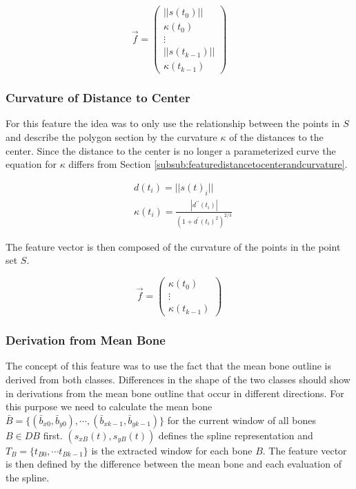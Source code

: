 \documentclass[pdftex,12pt,a4paper]{report}
\begin{document}
\begin{equation}
\vec{f} = \left( \begin{array}{c}
||s(t_0)|| \\
\kappa(t_0) \\
\vdots \\
||s(t_{k-1})|| \\
\kappa(t_{k-1})
\end{array} \right)
\end{equation}

\subsubsection{Curvature of Distance to Center}

For this feature the idea was to only use the relationship between the points in $S$ and describe
the polygon section by the curvature $\kappa$ of the distances to the center. Since the distance 
to the center is no longer a parameterized curve the equation for $\kappa$ differs from
Section \ref{subsub:featuredistancetocenterandcurvature}.

\begin{equation}
\begin{split}
& d(t_i) = ||s(t)_i|| \\
& \kappa(t_i) = \frac{|d^{\prime\prime}(t_i)|}{(1 + d^\prime(t_i)^2)^{2/3}}
\end{split}
\end{equation}

The feature vector is then composed of the curvature of the points in the point set $S$.

\begin{equation}
\vec{f} = \left( \begin{array}{c}
\kappa(t_0) \\
\vdots \\
\kappa(t_{k-1})
\end{array} \right)
\end{equation}

\subsubsection{Derivation from Mean Bone}

The concept of this feature was to use the fact that the mean bone outline is derived from both classes.
Differences in the shape of the two classes should show in derivations from the mean bone outline that
occur in different directions. For this purpose we need to calculate the mean bone $\bar{B} = \{ (\bar{b}_{x0}, \bar{b}_{y0}), \cdots, (\bar{b}_{xk-1}, \bar{b}_{yk-1}) \}$ for the current window of all bones $B \in DB$ first. $(s_{xB}(t), s_{yB}(t))$ defines the spline representation and $T_B = \{ t_{B0}, \cdots t_{Bk-1} \}$ is the extracted window for each bone $B$. The feature vector is then defined by the difference between the mean bone and
each evaluation of the spline.
\end{document}
